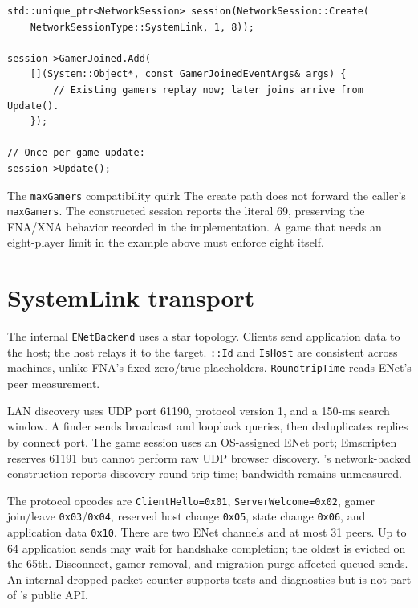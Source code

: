 \begin{lstlisting}
std::unique_ptr<NetworkSession> session(NetworkSession::Create(
    NetworkSessionType::SystemLink, 1, 8));

session->GamerJoined.Add(
    [](System::Object*, const GamerJoinedEventArgs& args) {
        // Existing gamers replay now; later joins arrive from Update().
    });

// Once per game update:
session->Update();
\end{lstlisting}

\begin{limitationnote}{The \texttt{maxGamers} compatibility quirk}
The create path does not forward the caller's \texttt{maxGamers}. The constructed session
reports the literal 69, preserving the FNA/XNA behavior recorded in the implementation. A game
that needs an eight-player limit in the example above must enforce eight itself.
\end{limitationnote}

\section{SystemLink transport}

The internal \texttt{ENetBackend} uses a star topology. Clients send application data to the
host; the host relays it to the target. \texttt{::Id} and
\texttt{IsHost} are consistent across machines, unlike FNA's fixed zero/true placeholders.
\texttt{RoundtripTime} reads ENet's peer measurement.

LAN discovery uses UDP port 61190, protocol version 1, and a 150-ms search window. A finder sends
broadcast and loopback queries, then deduplicates replies by connect port. The game session uses
an OS-assigned ENet port; Emscripten reserves 61191 but cannot perform raw UDP browser discovery.
's network-backed construction reports discovery round-trip time;
bandwidth remains unmeasured.

The protocol opcodes are \texttt{ClientHello=0x01}, \texttt{ServerWelcome=0x02}, gamer
join/leave \texttt{0x03}/\texttt{0x04}, reserved host change \texttt{0x05}, state change
\texttt{0x06}, and application data \texttt{0x10}. There are two ENet channels and at most 31
peers. Up to 64 application sends may wait for handshake completion; the oldest is evicted on
the 65th. Disconnect, gamer removal, and migration purge affected queued sends. An internal
dropped-packet counter supports tests and diagnostics but is not part of
's public API.

